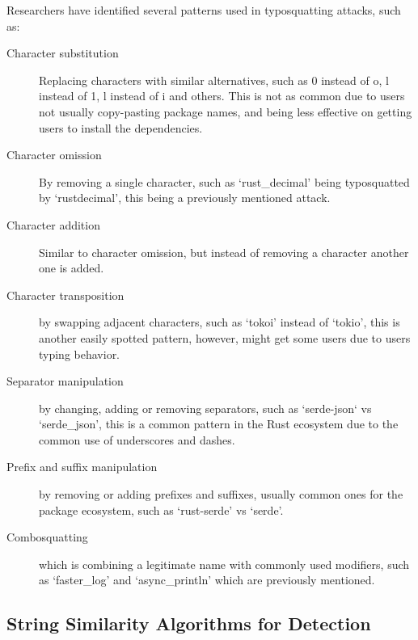 Researchers have identified several patterns used in typosquatting attacks, such as:
\begin{description}
	\item[Character substitution] Replacing characters with similar alternatives, such as 0 instead of o, l instead of 1, l instead of i and others. This is not as common due to users not usually copy-pasting package names, and being less effective on getting users to install the dependencies.
	\item[Character omission] By removing a single character, such as `rust\_decimal' being typosquatted by `rustdecimal', this being a previously mentioned attack.
	\item[Character addition] Similar to character omission, but instead of removing a character another one is added.
	\item[Character transposition] by swapping adjacent characters, such as `tokoi' instead of `tokio', this is another easily spotted pattern, however, might get some users due to users typing behavior.
	\item[Separator manipulation] by changing, adding or removing separators, such as `serde-json` vs `serde\_json', this is a common pattern in the Rust ecosystem due to the common use of underscores and dashes.
	\item[Prefix and suffix manipulation] by removing or adding prefixes and suffixes, usually common ones for the package ecosystem, such as `rust-serde' vs `serde'.
	\item[Combosquatting] which is combining a legitimate name with commonly used modifiers, such as `faster\_log' and `async\_println' which are previously mentioned.
\end{description}

\subsection{String Similarity Algorithms for Detection}\label{sect:string-similarity}

